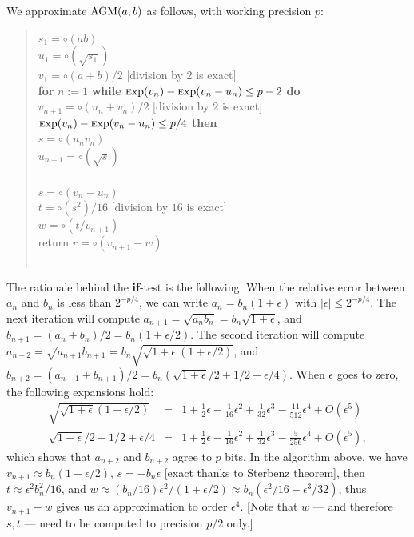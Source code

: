 \documentclass[12pt]{amsart}
\def\q{\hspace*{5mm}}
\def\Exp{{\rm \textsc exp}}
\begin{document}
We approximate ${\rm AGM}(a,b)$ as follows, with working precision $p$:
\begin{quote}
$s_1 = \circ(a b)$ \\
$u_1 = \circ(\sqrt{s_1})$ \\
$v_1 = \circ(a + b)/2$ [division by $2$ is exact] \\
{\bf for} $n:=1$ {\bf while} $\Exp(v_n) - \Exp(v_n-u_n) \leq p-2$ {\bf do} \\
\q $v_{n+1} = \circ(u_n + v_n)/2$ [division by $2$ is exact] \\
\q {\bf if} $\Exp(v_n) - \Exp(v_n-u_n) \leq p/4$ {\bf then} \\
\q \q $s = \circ(u_n v_n)$ \\
\q \q $u_{n+1} = \circ(\sqrt{s})$ \\
\q {\bf else} \\
\q \q $s = \circ(v_n - u_n)$ \\
\q \q $t = \circ(s^2)/16$ [division by $16$ is exact] \\
\q \q $w = \circ(t/v_{n+1})$ \\
\q \q return $r = \circ(v_{n+1}-w)$ \\
\q {\bf endif} \\
\end{quote}
The rationale behind the \textbf{if}-test is the following.
When the relative error between $a_n$ and $b_n$ is less than $2^{-p/4}$,
we can write $a_n = b_n (1+\epsilon)$ with $|\epsilon| \leq 2^{-p/4}$.
The next iteration will compute
$a_{n+1} = \sqrt{a_n b_n} = b_n \sqrt{1+\epsilon}$,
and $b_{n+1} = (a_n+b_n)/2 = b_n (1+\epsilon/2)$.
The second iteration will compute $a_{n+2} = \sqrt{a_{n+1} b_{n+1}}
= b_n \sqrt{\sqrt{1+\epsilon} (1+\epsilon/2)}$,
and $b_{n+2} = (a_{n+1}+b_{n+1})/2
= b_n (\sqrt{1+\epsilon}/2 + 1/2 + \epsilon/4)$.
When $\epsilon$ goes to zero, the following expansions hold:
\begin{eqnarray*}
\sqrt{\sqrt{1+\epsilon} (1+\epsilon/2)} & = & 1 + \frac{1}{2} \epsilon
  - \frac{1}{16} \epsilon^2 + \frac{1}{32} \epsilon^3 - \frac{11}{512}
  \epsilon^4 + O(\epsilon^5) \\
\sqrt{1+\epsilon}/2 + 1/2 + \epsilon/4 & = & 1 + \frac{1}{2} \epsilon
  - \frac{1}{16} \epsilon^2 + \frac{1}{32} \epsilon^3 - \frac{5}{256}
  \epsilon^4 + O(\epsilon^5),
\end{eqnarray*}
which shows that $a_{n+2}$ and $b_{n+2}$ agree to $p$ bits.
In the algorithm above, we have $v_{n+1} \approx b_n (1+\epsilon/2)$,
$s = -b_n \epsilon$ [exact thanks to Sterbenz theorem],
then $t \approx \epsilon^2 b_n^2/16$,
and $w \approx (b_n/16) \epsilon^2/(1+\epsilon/2) \approx
b_n (\epsilon^2/16 - \epsilon^3/32)$,
thus $v_{n+1}-w$ gives us an approximation to order $\epsilon^4$.
[Note that $w$ --- and therefore $s, t$ ---
need to be computed to precision $p/2$ only.]
\end{document}
